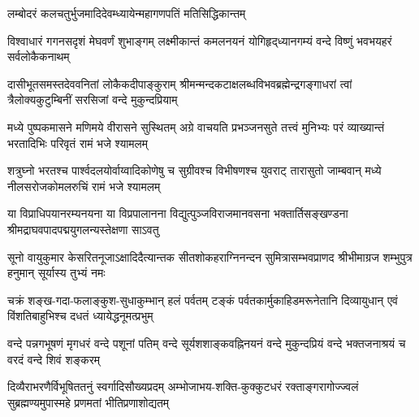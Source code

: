 {लम्बोदरं कलचतुर्भुजमादिदेवम्}{ध्यायेन्महागणपतिं मतिसिद्धिकान्तम्}


{विश्वाधारं गगनसदृशं मेघवर्णं शुभाङ्गम्}
{लक्ष्मीकान्तं कमलनयनं योगिहृद्‌ध्यानगम्यं}
{वन्दे विष्णुं भवभयहरं सर्वलोकैकनाथम्}


{दासीभूतसमस्तदेववनितां लोकैकदीपाङ्कुराम्}
{श्रीमन्मन्दकटाक्षलब्धविभवब्रह्मेन्द्रगङ्गाधरां}
{त्वां त्रैलोक्यकुटुम्बिनीं सरसिजां वन्दे मुकुन्दप्रियाम्}

{मध्ये पुष्पकमासने मणिमये वीरासने सुस्थितम्}
{अग्रे वाचयति प्रभञ्जनसुते तत्त्वं मुनिभ्यः परं}
{व्याख्यान्तं भरतादिभिः परिवृतं रामं भजे श्यामलम्}

{शत्रुघ्नो भरतश्च पार्श्वदलयोर्वाय्वादिकोणेषु च}
{सुग्रीवश्च विभीषणश्च युवराट् तारासुतो जाम्बवान्}
{मध्ये नीलसरोजकोमलरुचिं रामं भजे श्यामलम्}

{या विप्राधिपयानरम्यनयना या विप्रपालानना}
{विद्युत्पुञ्जविराजमानवसना भक्तार्तिसङ्खण्डना}
{श्रीमद्राघवपादपद्मयुगलन्यस्तेक्षणा साऽवतु}

{सूनो वायुकुमार केसरितनूजाऽक्षादिदैत्यान्तक}
{सीतशोकहराग्निनन्दन सुमित्रासम्भवप्राणद}
{श्रीभीमाग्रज शम्भुपुत्र हनुमान् सूर्यास्य तुभ्यं नमः}

{चक्रं शङ्ख-गदा-फलाङ्कुश-सुधाकुम्भान् हलं पर्वतम्}
{टङ्कं पर्वतकार्मुकाहिडमरूनेतानि दिव्यायुधान्}
{एवं विंशतिबाहुभिश्च दधतं ध्यायेद्धनूमत्प्रभुम्}

{वन्दे पन्नगभूषणं मृगधरं वन्दे पशूनां पतिम्}
{वन्दे सूर्यशशाङ्कवह्निनयनं वन्दे मुकुन्दप्रियं}
{वन्दे भक्तजनाश्रयं च वरदं वन्दे शिवं शङ्करम्}

{दिव्यैराभरणैर्विभूषिततनुं स्वर्गादिसौख्यप्रदम्}
{अम्भोजाभय-शक्ति-कुक्कुटधरं रक्ताङ्गरागोज्ज्वलं}
{सुब्रह्मण्यमुपास्महे प्रणमतां भीतिप्रणाशोद्यतम्}

